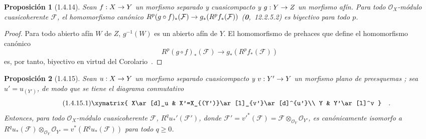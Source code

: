 \documentclass[10pt,oneside,openany]{book}
\theoremstyle{egaenv}\newtheorem*{env}{---}
\theoremstyle{egastatement}
\newtheorem*{proposition}{Proposición}
\theoremstyle{egadescription}
\renewcommand{\geq}{\geqslant}
\renewcommand{\to}{\mathchoice{\longrightarrow}{\rightarrow}{\rightarrow}{\rightarrow}}
\begin{document}
\begin{proposition}[1.4.14]
\label{III.1.4.14}
\label{III.1.4.14-fr}
Sean $f:X\to Y$ un morfismo separado y cuasicompacto y $g:Y\to Z$ un morfismo afín.
Para todo $\mathcal O_X$-módulo cuasicoherente $\mathcal F$, el homomorfismo canónico $R^p(g\circ f)_*(\mathcal F)\to g_*(R^pf_*(\mathcal F))$ \textup{(\textbf{0},~12.2.5.2)} es biyectivo para todo $p$.
\end{proposition}

\begin{proof}
Para todo abierto afín $W$ de $Z$, $g^{-1}(W)$ es un abierto afín de $Y$.
El homomorfismo de prehaces que define el homomorfismo canónico
\[
R^p(g\circ f)_*(\mathcal F)\longrightarrow g_*(R^pf_*(\mathcal F))
\]
 es, por tanto, biyectivo en virtud del Corolario~.
\end{proof}

\begin{proposition}[1.4.15]
\label{III.1.4.15}
\label{III.1.4.15-fr}
Sean $u:X\to Y$ un morfismo separado cuasicompacto y $v:Y'\to Y$ un morfismo plano de preesquemas \textup{}; sea $u'=u_{(Y')}$, de modo que se tiene el diagrama conmutativo
\begin{equation}
\label{III.1.4.15.1-fr}
\tag{1.4.15.1}
\xymatrix{
X\ar[d]_u & X'=X_{(Y')}\ar[l]_{v'}\ar[d]^{u'}\\
Y & Y'\ar[l]^v
}\quad.
\end{equation}
Entonces, para todo $\mathcal O_X$-módulo cuasicoherente $\mathcal F$, $R^qu_*'(\mathcal F')$, donde
$\mathcal F'=v'^*(\mathcal F)=\mathcal F\otimes_{\mathcal O_Y}\mathcal O_{Y'}$,
es canónicamente isomorfo a
$R^qu_*(\mathcal F)\otimes_{\mathcal O_Y}\mathcal O_{Y'}
=v^*(R^qu_*(\mathcal F))$ para todo $q\geq0$.
\end{proposition}
\end{document}
